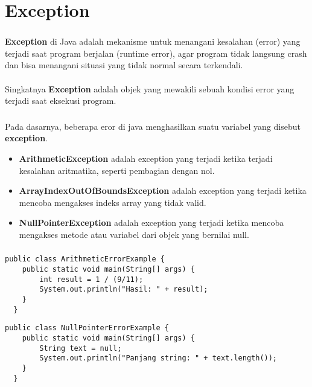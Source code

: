 \documentclass{../praktikum-ppt}
\begin{document}
    \section{Exception}
    \begin{frame}
      \frametitle{\insertsection}
      \begin{definisi}
        \textbf{Exception} di Java adalah mekanisme untuk menangani kesalahan (error) yang terjadi saat program berjalan (runtime error), agar program tidak langsung crash dan bisa menangani situasi yang tidak normal secara terkendali.\\~\\

        Singkatnya \textbf{Exception} adalah objek yang mewakili sebuah kondisi error yang terjadi saat eksekusi program.
      \end{definisi}
    \end{frame}

    \begin{frame}
      \frametitle{\insertsection}
      \begin{contoh}
        Pada dasarnya, beberapa eror di java menghasilkan suatu variabel yang disebut \textbf{exception}.
        \begin{itemize}
          \item \textbf{ArithmeticException} adalah exception yang terjadi ketika terjadi kesalahan aritmatika, seperti pembagian dengan nol.
          \item \textbf{ArrayIndexOutOfBoundsException} adalah exception yang terjadi ketika mencoba mengakses indeks array yang tidak valid.
          \item \textbf{NullPointerException} adalah exception yang terjadi ketika mencoba mengakses metode atau variabel dari objek yang bernilai null.
        \end{itemize}
      \end{contoh}
    \end{frame}

    \begin{frame}[fragile]
      \frametitle{\insertsection}
      \begin{lstlisting}[caption={\textit{ArithmeticException}}]
  public class ArithmeticErrorExample {
    public static void main(String[] args) {
        int result = 1 / (9/11); 
        System.out.println("Hasil: " + result);
    }
  }
        \end{lstlisting}
        \begin{lstlisting}[caption={\textit{NullPointerException}}]
  public class NullPointerErrorExample {
    public static void main(String[] args) {
        String text = null;
        System.out.println("Panjang string: " + text.length());
    }
  }
        \end{lstlisting}
    \end{frame}
\end{document}
